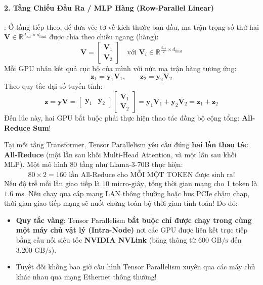 \paragraph{2. Tầng Chiếu Đầu Ra / MLP Hàng (Row-Parallel Linear)}:
Ở tầng tiếp theo, để đưa véc-tơ về kích thước ban đầu, ma trận trọng số thứ hai $\mathbf{V} \in \mathbb{R}^{d_{\text{out}} \times d_{\text{final}}}$ được chia theo chiều ngang (hàng):
\begin{equation}
\mathbf{V} = \begin{bmatrix} \mathbf{V}_1 \\ \mathbf{V}_2 \end{bmatrix} \quad \text{với } \mathbf{V}_i \in \mathbb{R}^{\frac{d_{\text{out}}}{2} \times d_{\text{final}}}
\end{equation}
Mỗi GPU nhân kết quả cục bộ của mình với nửa ma trận hàng tương ứng:
\begin{equation}
\mathbf{z}_1 = \mathbf{y}_1 \mathbf{V}_1, \qquad \mathbf{z}_2 = \mathbf{y}_2 \mathbf{V}_2
\end{equation}
Theo quy tắc đại số tuyến tính:
\begin{equation}
\mathbf{z} = \mathbf{y} \mathbf{V} = \begin{bmatrix} \mathbf{y}_1 & \mathbf{y}_2 \end{bmatrix} \begin{bmatrix} \mathbf{V}_1 \\ \mathbf{V}_2 \end{bmatrix} = \mathbf{y}_1 \mathbf{V}_1 + \mathbf{y}_2 \mathbf{V}_2 = \mathbf{z}_1 + \mathbf{z}_2
\end{equation}
Đến lúc này, hai GPU bắt buộc phải thực hiện thao tác đồng bộ cộng tổng: \textbf{All-Reduce Sum}!

\begin{tradeoffbox}
Tại mỗi tầng Transformer, Tensor Parallelism yêu cầu đúng \textbf{hai lần thao tác All-Reduce} (một lần sau khối Multi-Head Attention, và một lần sau khối MLP).
Một mô hình 80 tầng như Llama-3-70B thực hiện:
\begin{equation*}
80 \times 2 = 160\text{ lần All-Reduce cho MỖI MỘT TOKEN được sinh ra!}
\end{equation*}
Nếu độ trễ mỗi lần giao tiếp là $10\text{ micro-giây}$, tổng thời gian mạng cho 1 token là $1.6\text{ ms}$.
Nếu chạy qua cáp mạng LAN thông thường hoặc bus PCIe chậm chạp, thời gian giao tiếp mạng sẽ nuốt chửng toàn bộ thời gian tính toán!
Do đó:
\begin{itemize}
  \item \textbf{Quy tắc vàng}: Tensor Parallelism \textbf{bắt buộc chỉ được chạy trong cùng một máy chủ vật lý (Intra-Node)} nơi các GPU được liên kết trực tiếp bằng cầu nối siêu tốc \textbf{NVIDIA NVLink} (băng thông từ $600\text{ GB/s}$ đến $3.200\text{ GB/s}$).
  \item Tuyệt đối không bao giờ cấu hình Tensor Parallelism xuyên qua các máy chủ khác nhau qua mạng Ethernet thông thường!
\end{itemize}
\end{tradeoffbox}

